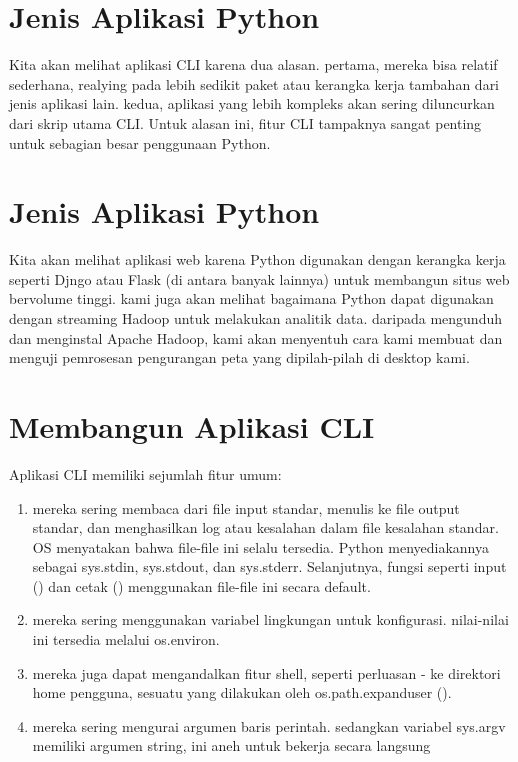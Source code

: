 \documentclass[12pt, times new roman, a4paper]{article}
\begin{document}
\section{Jenis Aplikasi Python}
Kita akan melihat aplikasi CLI karena dua alasan. pertama, mereka bisa relatif sederhana, realying pada lebih sedikit paket atau kerangka kerja tambahan dari jenis aplikasi lain. kedua, aplikasi yang lebih kompleks akan sering diluncurkan dari skrip utama CLI. Untuk alasan ini, fitur CLI tampaknya sangat penting untuk sebagian besar penggunaan Python.

\section{Jenis Aplikasi Python}
Kita akan melihat aplikasi web karena Python digunakan dengan kerangka kerja seperti Djngo atau Flask (di antara banyak lainnya) untuk membangun situs web bervolume tinggi.
kami juga akan melihat bagaimana Python dapat digunakan dengan streaming Hadoop untuk melakukan analitik data. daripada mengunduh dan menginstal Apache Hadoop, kami akan menyentuh cara kami membuat dan menguji pemrosesan pengurangan peta yang dipilah-pilah di desktop kami.

\section{Membangun Aplikasi CLI}
Aplikasi CLI memiliki sejumlah fitur umum:

\begin{enumerate}

\item mereka sering membaca dari file input standar, menulis ke file output standar, dan menghasilkan log atau kesalahan dalam file kesalahan standar. OS menyatakan bahwa file-file ini selalu tersedia. Python menyediakannya sebagai sys.stdin, sys.stdout, dan sys.stderr. Selanjutnya, fungsi seperti input () dan cetak () menggunakan file-file ini secara default.
\item mereka sering menggunakan variabel lingkungan untuk konfigurasi. nilai-nilai ini tersedia melalui os.environ.
\item mereka juga dapat mengandalkan fitur shell, seperti perluasan - ke direktori home pengguna, sesuatu yang dilakukan oleh os.path.expanduser ().
\item mereka sering mengurai argumen baris perintah. sedangkan variabel sys.argv memiliki argumen string, ini aneh untuk bekerja secara langsung

\end{enumerate}
\end{document}
